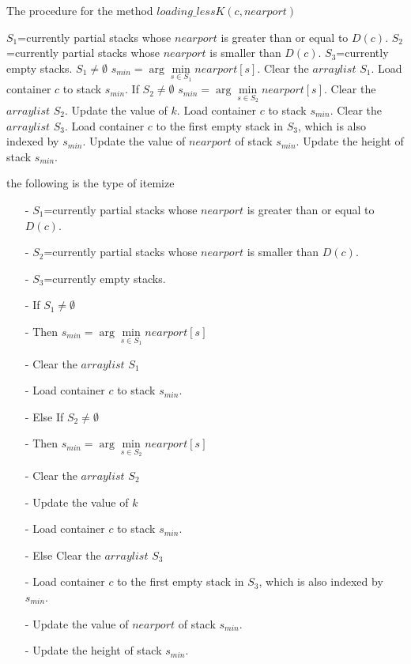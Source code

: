 \documentclass[review,3p,times,authoryear,12pt]{elsarticle}
\begin{document}
\begin{algorithm}[!htbp]
    \caption{The procedure for the method $loading\_lessK(c,nearport)$}
    \label{alg:3}
    \begin{codebox}
        \li $S_1$=currently partial stacks whose $nearport$ is greater than or equal to $D(c)$.
        \li $S_2$=currently partial stacks whose $nearport$ is smaller than $D(c)$.
        \li $S_3$=currently empty stacks.
        \li \If $S_1\neq \emptyset$
        \li \Then
                        $s_{min}=\arg\min \limits_{s\in S_1} nearport[s]$.
        \li             Clear the $arraylist$ $S_1$.
        \li             Load container $c$ to stack $s_{min}$.
        \li    \Else If $S_2\neq \emptyset$
                        \Then
        \li               $s_{min}=\arg\min \limits_{s\in S_2} nearport[s]$.
        \li               Clear the $arraylist$ $S_2$.
        \li               Update the value of $k$.
        \li               Load container $c$ to stack $s_{min}$.
        \li         \Else
        \li               Clear the $arraylist$ $S_3$.
        \li               Load container $c$ to the first empty stack in $S_3$, which is also indexed by $s_{min}$.
                    \End
             \End
        \li Update the value of $nearport$ of stack $s_{min}$.
        \li Update the height of stack $s_{min}$.
\end{codebox}
\end{algorithm}



 the following is the type of itemize
 
\begin{itemize}
\label{item:1}
\item[-] $S_1$=currently partial stacks whose $nearport$ is greater than or equal to $D(c)$.
\item[-] $S_2$=currently partial stacks whose $nearport$ is smaller than $D(c)$.
\item[-] $S_3$=currently empty stacks.
\item[-] If $S_1\neq \emptyset$
\item[-] Then $s_{min}=\arg\min \limits_{s\in S_1} nearport[s]$
\item[-] Clear the $arraylist$ $S_1$
\item[-] Load container $c$ to stack $s_{min}$.
\item[-] Else If $S_2\neq \emptyset$
\item[-] Then $s_{min}=\arg\min \limits_{s\in S_2} nearport[s]$
\item[-] Clear the $arraylist$ $S_2$
\item[-] Update the value of $k$
\item[-] Load container $c$ to stack $s_{min}$.
\item[-] Else Clear the $arraylist$ $S_3$
\item[-] Load container $c$ to the first empty stack in $S_3$, which is also indexed by $s_{min}$.
\item[-] Update the value of $nearport$ of stack $s_{min}$.
\item[-] Update the height of stack $s_{min}$.
\end{itemize}
\end{document}
